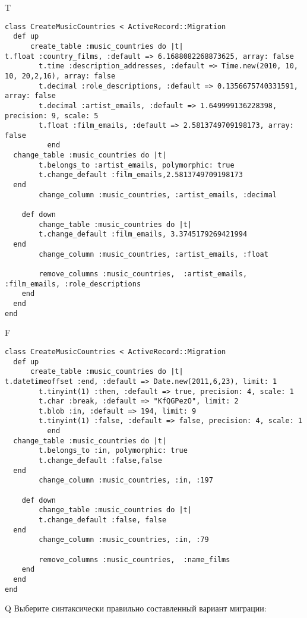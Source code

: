 T
\begin{verbatim}
class CreateMusicCountries < ActiveRecord::Migration
  def up
	  create_table :music_countries do |t|
t.float :country_films, :default => 6.1688082268873625, array: false
		t.time :description_addresses, :default => Time.new(2010, 10, 10, 20,2,16), array: false
		t.decimal :role_descriptions, :default => 0.1356675740331591, array: false
		t.decimal :artist_emails, :default => 1.649999136228398, precision: 9, scale: 5
		t.float :film_emails, :default => 2.5813749709198173, array: false
		  end
  change_table :music_countries do |t|
		t.belongs_to :artist_emails, polymorphic: true
 		t.change_default :film_emails,2.5813749709198173
  end
 		change_column :music_countries, :artist_emails, :decimal
   
	def down
		change_table :music_countries do |t|
		t.change_default :film_emails, 3.3745179269421994
  end
 		change_column :music_countries, :artist_emails, :float
   
		remove_columns :music_countries,  :artist_emails, :film_emails, :role_descriptions 
    end 
  end
end

\end{verbatim}

F
\begin{verbatim}
class CreateMusicCountries < ActiveRecord::Migration
  def up
	  create_table :music_countries do |t|
t.datetimeoffset :end, :default => Date.new(2011,6,23), limit: 1
		t.tinyint(1) :then, :default => true, precision: 4, scale: 1
		t.char :break, :default => "KfQGPezO", limit: 2
		t.blob :in, :default => 194, limit: 9
		t.tinyint(1) :false, :default => false, precision: 4, scale: 1
		  end
  change_table :music_countries do |t|
		t.belongs_to :in, polymorphic: true
 		t.change_default :false,false
  end
 		change_column :music_countries, :in, :197
   
	def down
		change_table :music_countries do |t|
		t.change_default :false, false
  end
 		change_column :music_countries, :in, :79
   
		remove_columns :music_countries,  :name_films 
    end 
  end
end

\end{verbatim}

Q
Выберите синтаксически правильно составленный вариант миграции:

